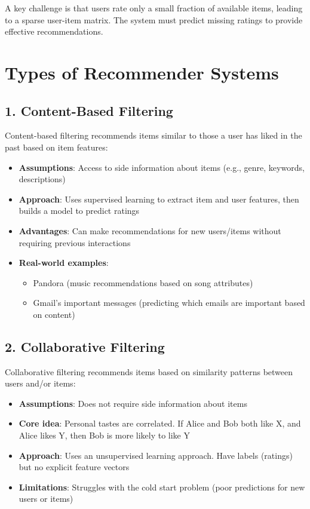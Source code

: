 \documentclass[
  letterpaper,
  DIV=11,
  numbers=noendperiod]{scrreprt}
\providecommand{\tightlist}{%
  \setlength{\itemsep}{0pt}\setlength{\parskip}{0pt}}\usepackage{longtable,booktabs,array}
\begin{document}
A key challenge is that users rate only a small fraction of available
items, leading to a sparse user-item matrix. The system must predict
missing ratings to provide effective recommendations.

\section{Types of Recommender
Systems}\label{types-of-recommender-systems}

\subsection{1. Content-Based Filtering}\label{content-based-filtering}

Content-based filtering recommends items similar to those a user has
liked in the past based on item features:

\begin{itemize}
\tightlist
\item
  \textbf{Assumptions}: Access to side information about items (e.g.,
  genre, keywords, descriptions)
\item
  \textbf{Approach}: Uses supervised learning to extract item and user
  features, then builds a model to predict ratings
\item
  \textbf{Advantages}: Can make recommendations for new users/items
  without requiring previous interactions
\item
  \textbf{Real-world examples}:

  \begin{itemize}
  \tightlist
  \item
    Pandora (music recommendations based on song attributes)
  \item
    Gmail's important messages (predicting which emails are important
    based on content)
  \end{itemize}
\end{itemize}

\subsection{2. Collaborative Filtering}\label{collaborative-filtering}

Collaborative filtering recommends items based on similarity patterns
between users and/or items:

\begin{itemize}
\tightlist
\item
  \textbf{Assumptions}: Does not require side information about items
\item
  \textbf{Core idea}: Personal tastes are correlated. If Alice and Bob
  both like X, and Alice likes Y, then Bob is more likely to like Y
\item
  \textbf{Approach}: Uses an unsupervised learning approach. Have labels
  (ratings) but no explicit feature vectors
\item
  \textbf{Limitations}: Struggles with the cold start problem (poor
  predictions for new users or items)
\end{itemize}
\end{document}
